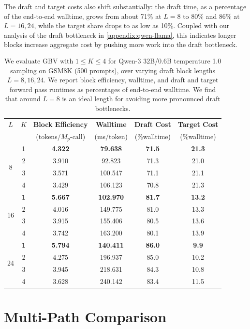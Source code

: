 \documentclass{article}
\theoremstyle{plain}
\theoremstyle{definition}
\theoremstyle{remark}
\begin{document}
The draft and target costs also shift substantially: the draft time, as a percentage of the end-to-end walltime, grows from about 71\% at $L=8$ to 80\% and 86\% at $L=16,24$, while the target share drops to as low as 10\%. Coupled with our analysis of the draft bottleneck in \cref{appendix:qwen-llama}, this indicates longer blocks increase aggregate cost by pushing more work into the draft bottleneck.


\begin{table}[htbp]
\centering
\begin{tabular}{@{}cccccc@{}}
\toprule
$L$ & $K$ & \textbf{Block Efficiency} & \textbf{Walltime} & \textbf{Draft Cost} & \textbf{Target Cost} \\
& & (tokens/$M_p$-call) & (ms/token)& (\%walltime) & (\%walltime) \\
\midrule
\multirow{4}{*}{8}
& \textbf{1} & \textbf{4.322} & \textbf{79.638}  &\textbf{ 71.5} & \textbf{21.3} \\
  & 2 & 3.910 & 92.823  & 71.3 & 21.0 \\
  & 3 & 3.571 & 100.547 & 71.1 & 21.1 \\
  & 4 & 3.429 & 106.123 & 70.8 & 21.3 \\
\midrule
\multirow{4}{*}{16}
 & \textbf{1} & \textbf{5.667} & \textbf{102.970} &\textbf{ 81.7} & \textbf{13.2} \\
 & 2 & 4.016 & 149.775 & 81.0 & 13.3 \\
 & 3 & 3.915 & 155.406 & 80.5 & 13.6 \\
 & 4 & 3.742 & 163.200 & 80.1 & 13.9 \\
\midrule
\multirow{4}{*}{24}
 & \textbf{1} & \textbf{5.794} & \textbf{140.411} & \textbf{86.0} & \textbf{9.9}  \\
 & 2 & 4.275 & 196.937 & 85.0 & 10.2 \\
 & 3 & 3.945 & 218.631 & 84.3 & 10.8 \\
 & 4 & 3.628 & 240.142 & 83.4 & 11.5 \\
\bottomrule
\end{tabular}
\caption{We evaluate GBV with $1 \leq K \leq 4$ for Qwen-3 32B/0.6B temperature 1.0 sampling on GSM8K (500 prompts), over varying draft block lengths $L=8,16,24$. We report block efficiency, walltime, and draft and target forward pass runtimes as percentages of end-to-end walltime. We find that around $L=8$ is an ideal length for avoiding more pronounced draft bottlenecks.}
\label{tab:qwen-l-sweep}
\end{table}


\section{Multi-Path Comparison}
\label{appendix:multi-path-compare}
\end{document}
